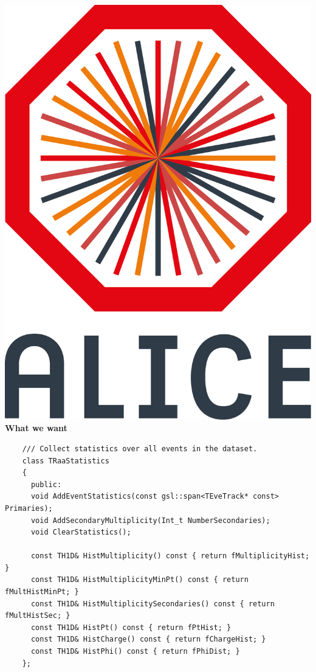 \documentclass[aspectratio=169,14pt,dvipsnames]{beamer}
\begin{document}
\begin{frame}[fragile]{\includegraphics[height=0.07\textheight]{2012-Jul-04-4_Color_Logo_CB.png} \hspace{0.2cm}\textbf{What we want}}
  \begin{verbatim}
    /// Collect statistics over all events in the dataset.
    class TRaaStatistics
    {
      public:
      void AddEventStatistics(const gsl::span<TEveTrack* const> Primaries);
      void AddSecondaryMultiplicity(Int_t NumberSecondaries);
      void ClearStatistics();

      const TH1D& HistMultiplicity() const { return fMultiplicityHist; }
      const TH1D& HistMultiplicityMinPt() const { return fMultHistMinPt; }
      const TH1D& HistMultiplicitySecondaries() const { return fMultHistSec; }
      const TH1D& HistPt() const { return fPtHist; }
      const TH1D& HistCharge() const { return fChargeHist; }
      const TH1D& HistPhi() const { return fPhiDist; }
    };
  \end{verbatim}
\end{frame}
\end{document}
